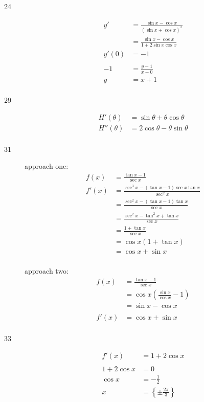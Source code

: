 \documentclass[letterpaper, landscape]{exam}
\begin{document}
\begin{description}
    \item[24] 
      \begin{align*}
        y'    & = \frac{\sin x - \cos x}{(\sin x + \cos x)^2} \\
              & = \frac{\sin x - \cos x}{1 + 2 \sin x \cos x} \\
        y'(0) & = -1 \\
         \\
        -1 & = \frac{y - 1}{x - 0} \\
        y  & = x + 1 \\
      \end{align*}

    \item[29] 
      \begin{align*}
        H'(\theta)  & = \sin \theta + \theta \cos \theta \\
        H''(\theta) & = 2 \cos \theta - \theta \sin \theta \\
      \end{align*}

    \item[31] 
      approach one:
      \begin{align*}
        f(x)  & = \frac{\tan x - 1}{\sec x} \\
        f'(x) & = \frac{\sec^3 x - (\tan x - 1) \sec x \tan x}{\sec^2 x} \\
              & = \frac{\sec^2 x - (\tan x - 1) \tan x}{\sec x} \\
              & = \frac{\sec^2 x - \tan^2 x + \tan x}{\sec x} \\
              & = \frac{1 + \tan x}{\sec x} \\
              & = \cos x (1 + \tan x) \\
              & = \cos x + \sin x \\
      \end{align*}

      approach two:
      \begin{align*}
        f(x)  & = \frac{\tan x - 1}{\sec x} \\
              & = \cos x \left( \frac{\sin x}{\cos x} - 1 \right) \\
              & = \sin x - \cos x \\
        \\
        f'(x) & = \cos x + \sin x \\
      \end{align*}

    \item[33] 
      \begin{align*}
        f'(x)        & = 1 + 2 \cos x \\
        \\
        1 + 2 \cos x & = 0 \\
        \cos x       & = - \frac{1}{2} \\
        x            & = \left\{ \pm \frac{2 \pi}{3} \right\} \\
      \end{align*}


\end{description}
\end{document}
